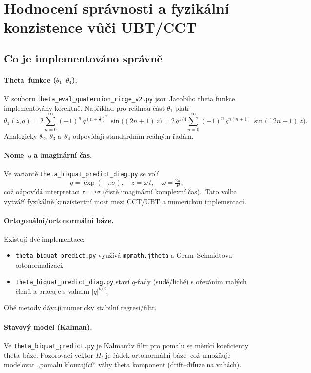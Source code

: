 \documentclass{article}
\begin{document}
\section*{Hodnocení správnosti a fyzikální konzistence vůči UBT/CCT}

\subsection*{Co je implementováno správně}

\paragraph{Theta funkce ($\theta_1$–$\theta_4$).}
V souboru \texttt{theta\_eval\_quaternion\_ridge\_v2.py} jsou Jacobiho theta funkce implementovány korektně. Například pro reálnou část $\theta_1$ platí
\[
  \theta_1(z,q) = 2 \sum_{n=0}^\infty (-1)^n\, q^{\left(n + \tfrac12\right)^2} \, \sin\bigl((2n+1)\,z\bigr)
  = 2\, q^{1/4} \sum_{n=0}^\infty (-1)^n\, q^{n(n+1)} \, \sin\bigl((2n+1)\,z\bigr).
\]
Analogicky $\theta_2$, $\theta_3$ a $\theta_4$ odpovídají standardním reálným řadám.

\paragraph{Nome $q$ a imaginární čas.}
Ve variantě \texttt{theta\_biquat\_predict\_diag.py} se volí
\[
  q = \exp(-\pi\sigma), 
  \quad z = \omega\,t, 
  \quad \omega = \tfrac{2\pi}{P},
\]
což odpovídá interpretaci $\tau = i\sigma$ (čistě imaginární komplexní čas). Tato volba vytváří fyzikálně konzistentní most mezi CCT/UBT a numerickou implementací.

\paragraph{Ortogonální/ortonormální báze.}
Existují dvě implementace:
\begin{itemize}
  \item \texttt{theta\_biquat\_predict.py} využívá \texttt{mpmath.jtheta} a Gram–Schmidtovu ortonormalizaci.
  \item \texttt{theta\_biquat\_predict\_diag.py} staví $q$‑řady (sudé/liché) s ořezáním malých členů a pracuje s vahami $|q|^{k/2}$.
\end{itemize}
Obě metody dávají numericky stabilní regresi/filtr.

\paragraph{Stavový model (Kalman).}
Ve \texttt{theta\_biquat\_predict.py} je Kalmanův filtr pro pomalu se měnící koeficienty theta báze. Pozorovací vektor $H_t$ je řádek ortonormální báze, což umožňuje modelovat „pomalu klouzající“ váhy theta komponent (drift–difuze na vahách).
\end{document}
